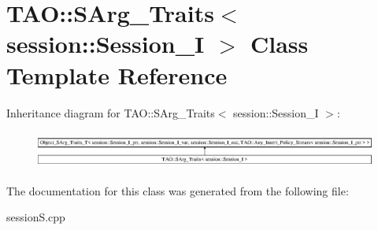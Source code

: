 \section{T\+AO\+:\+:S\+Arg\+\_\+\+Traits$<$ session\+:\+:Session\+\_\+I $>$ Class Template Reference}
\label{classTAO_1_1SArg__Traits_3_01session_1_1Session__I_01_4}
Inheritance diagram for T\+AO\+:\+:S\+Arg\+\_\+\+Traits$<$ session\+:\+:Session\+\_\+I $>$\+:\begin{figure}[H]
\begin{center}
\leavevmode
\includegraphics[height=1.240310cm]{classTAO_1_1SArg__Traits_3_01session_1_1Session__I_01_4}
\end{center}
\end{figure}


The documentation for this class was generated from the following file\+:\begin{DoxyCompactItemize}
\item 
session\+S.\+cpp\end{DoxyCompactItemize}
